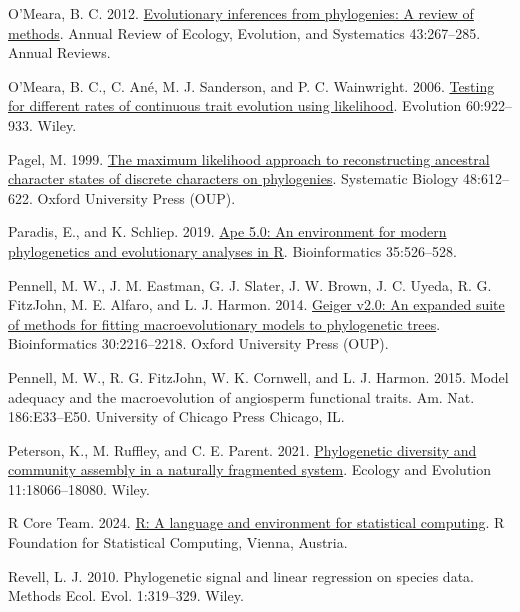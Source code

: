 \documentclass[fleqn,10pt,lineno]{wlpeerj} %
\newlength{\cslhangindent}
\newenvironment{CSLReferences}[2] %
 {\begin{list}{}{%
  \setlength{\itemindent}{0pt}
  \setlength{\leftmargin}{0pt}
  \setlength{\parsep}{0pt}
  \ifodd #1
   \setlength{\leftmargin}{\cslhangindent}
   \setlength{\itemindent}{-1\cslhangindent}
  \fi
  \setlength{\itemsep}{#2\baselineskip}}}
 {\end{list}}
\begin{document}
\begin{CSLReferences}{1}{0}
O'Meara, B. C. 2012. \href{https://doi.org/10.1146/annurev-ecolsys-110411-160331}{Evolutionary inferences from phylogenies: A review of methods}. Annual Review of Ecology, Evolution, and Systematics 43:267--285. Annual Reviews.

O'Meara, B. C., C. Ané, M. J. Sanderson, and P. C. Wainwright. 2006. \href{https://doi.org/10.1111/j.0014-3820.2006.tb01171.x}{Testing for different rates of continuous trait evolution using likelihood}. Evolution 60:922--933. Wiley.

Pagel, M. 1999. \href{https://doi.org/10.1080/106351599260184}{The maximum likelihood approach to reconstructing ancestral character states of discrete characters on phylogenies}. Systematic Biology 48:612--622. Oxford University Press (OUP).

Paradis, E., and K. Schliep. 2019. \href{https://doi.org/10.1093/bioinformatics/bty633}{Ape 5.0: An environment for modern phylogenetics and evolutionary analyses in {R}}. Bioinformatics 35:526--528.

Pennell, M. W., J. M. Eastman, G. J. Slater, J. W. Brown, J. C. Uyeda, R. G. FitzJohn, M. E. Alfaro, and L. J. Harmon. 2014. \href{https://doi.org/10.1093/bioinformatics/btu181}{Geiger v2.0: An expanded suite of methods for fitting macroevolutionary models to phylogenetic trees}. Bioinformatics 30:2216--2218. Oxford University Press (OUP).

Pennell, M. W., R. G. FitzJohn, W. K. Cornwell, and L. J. Harmon. 2015. Model adequacy and the macroevolution of angiosperm functional traits. Am. Nat. 186:E33--E50. University of Chicago Press Chicago, IL.

Peterson, K., M. Ruffley, and C. E. Parent. 2021. \href{https://doi.org/10.1002/ece3.8404}{Phylogenetic diversity and community assembly in a naturally fragmented system}. Ecology and Evolution 11:18066--18080. Wiley.

R Core Team. 2024. \href{https://www.R-project.org/}{R: A language and environment for statistical computing}. R Foundation for Statistical Computing, Vienna, Austria.

Revell, L. J. 2010. Phylogenetic signal and linear regression on species data. Methods Ecol. Evol. 1:319--329. Wiley.


\end{CSLReferences}
\end{document}
